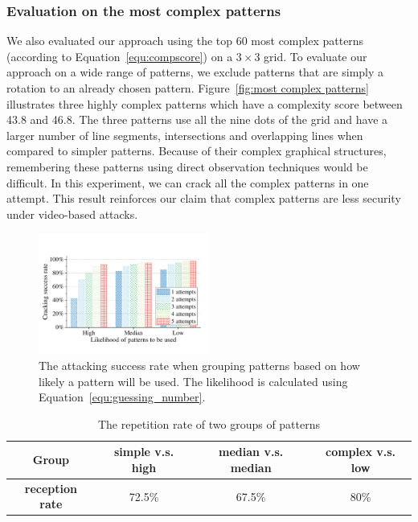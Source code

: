      \subsubsection{Evaluation on the most complex patterns}
       We also evaluated our approach using the top 60 most complex
        patterns (according to Equation~\ref {equ:compscore}) on a $3 \times 3$
        grid.
        To evaluate our approach on a wide range of patterns, we exclude patterns that are simply a rotation to an already chosen pattern.
         Figure~\ref{fig:most complex patterns} illustrates three
        highly complex patterns which have a complexity score between 43.8 and 46.8. The three
        patterns use all the nine dots of the grid and have a larger number of line segments, intersections and overlapping lines when compared to simpler patterns.
        Because of their complex graphical structures, remembering
        these patterns using direct observation techniques would be difficult.
        In this experiment, we can crack all the complex patterns in one attempt. This result reinforces our claim that complex
        patterns are less security under video-based attacks.


       \begin{figure}[!t]
            \centering
            \includegraphics[width=0.5\textwidth]{fig/usibility_crackingNum.pdf}
            \caption{The attacking success rate when grouping patterns based on how likely a pattern will be used.
            The likelihood is calculated using Equation~\ref{equ:guessing_number}.}
            \label{fig:usage-crackingNum}
        \end{figure}

        \begin{table}[!t]
            \centering
            \caption{The repetition rate of two groups of patterns}
            \vspace{-0.2mm}
            \label{tab:repetition_rate}
            \scriptsize
            \begin{tabular}{cccc}
                \toprule
                \textbf{Group}& simple v.s. high & median v.s. median & complex v.s. low \\
                \midrule
                \textbf{reception rate}  & 72.5\% & 67.5\% & 80\% \\
                \bottomrule
            \end{tabular}
        \end{table}

